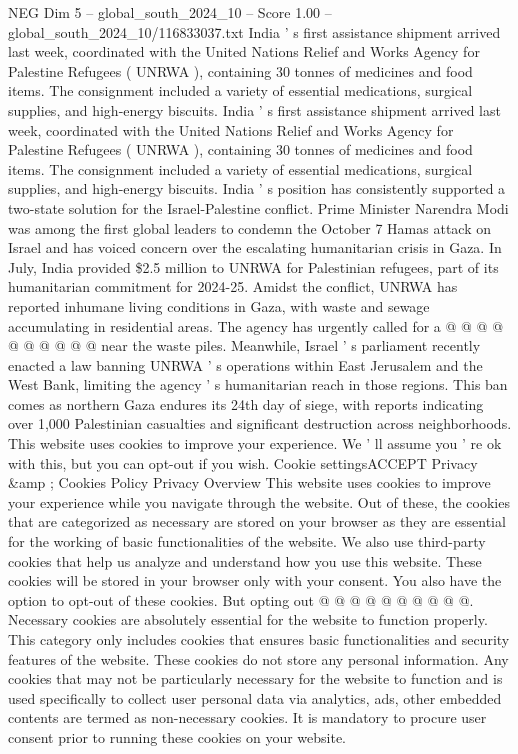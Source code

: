 \begin{textsample}{NEG Dim 5 – global\_south\_2024\_10 – Score 1.00 – global\_south\_2024\_10/116833037.txt}  \label{ex:f5_neg_107}
India ' s first assistance shipment arrived last week, coordinated with the United Nations Relief and Works Agency for Palestine Refugees ( UNRWA ), containing 30 tonnes of medicines and food items.
The consignment included a variety of essential medications, surgical supplies, and high-energy biscuits.
India ' s first assistance shipment arrived last week, coordinated with the United Nations Relief and Works Agency for Palestine Refugees ( UNRWA ), containing 30 tonnes of medicines and food items.
The consignment included a variety of essential medications, surgical supplies, and high-energy biscuits.
India ' s position has consistently supported a two-state solution for the Israel-Palestine conflict.
Prime Minister Narendra Modi was among the first global leaders to condemn the October 7 Hamas attack on Israel and has voiced concern over the escalating humanitarian crisis in Gaza.
In July, India provided \$2.5 million to UNRWA for Palestinian refugees, part of its humanitarian commitment for 2024-25.
Amidst the conflict, UNRWA has reported inhumane living conditions in Gaza, with waste and sewage accumulating in residential areas.
The agency has urgently called for a @ @ @ @ @ @ @ @ @ @ near the waste piles.
Meanwhile, Israel ' s parliament recently enacted a law banning UNRWA ' s operations within East Jerusalem and the West Bank, limiting the agency ' s humanitarian reach in those regions.
This ban comes as northern Gaza endures its 24th day of siege, with reports indicating over 1,000 Palestinian casualties and significant destruction across neighborhoods.
This website uses cookies to improve your experience.
We ' ll assume you ' re ok with this, but you can opt-out if you wish.
Cookie settingsACCEPT Privacy \&amp ; Cookies Policy Privacy Overview This website uses cookies to improve your experience while you navigate through the website.
Out of these, the cookies that are categorized as necessary are stored on your browser as they are essential for the working of basic functionalities of the website.
We also use third-party cookies that help us analyze and understand how you use this website.
These cookies will be stored in your browser only with your consent.
You also have the option to opt-out of these cookies.
But opting out @ @ @ @ @ @ @ @ @ @.
Necessary cookies are absolutely essential for the website to function properly.
This category only includes cookies that ensures basic functionalities and security features of the website.
These cookies do not store any personal information.
Any cookies that may not be particularly necessary for the website to function and is used specifically to collect user personal data via analytics, ads, other embedded contents are termed as non-necessary cookies.
It is mandatory to procure user consent prior to running these cookies on your website.

\end{textsample}
